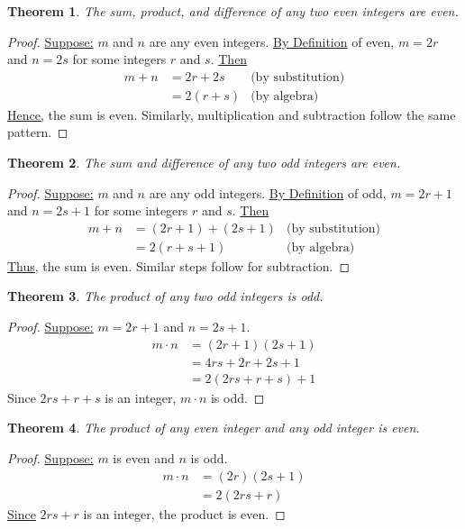 \documentclass[12pt]{article}
\newcounter{theo}[section]
\newtheorem{theorem}{Theorem}
\begin{document}
\begin{theorem}
	The sum, product, and difference of any two even integers are even.
\end{theorem}
\begin{proof}
	\underline{Suppose:} $m$ and $n$ are any even integers.\newline
	\underline{By Definition} of even, $m = 2r$ and $n = 2s$ for some integers $r$ and $s$.\newline
	\underline{Then}
	\begin{align*}
		m + n & = 2r + 2s  & \text{(by substitution)} \\
		      & = 2(r + s) & \text{(by algebra)}
	\end{align*}
	\underline{Hence,} the sum is even. Similarly, multiplication and subtraction follow the same pattern.
\end{proof}

\begin{theorem}
	The sum and difference of any two odd integers are even.
\end{theorem}
\begin{proof}
	\underline{Suppose:} $m$ and $n$ are any odd integers.\newline
	\underline{By Definition} of odd, $m = 2r + 1$ and $n = 2s + 1$ for some integers $r$ and $s$.\newline
	\underline{Then}
	\begin{align*}
		m + n & = (2r + 1) + (2s + 1) & \text{(by substitution)} \\
		      & = 2(r + s + 1)        & \text{(by algebra)}
	\end{align*}
	\underline{Thus,} the sum is even. Similar steps follow for subtraction.
\end{proof}

\begin{theorem}
	The product of any two odd integers is odd.
\end{theorem}
\begin{proof}
	\underline{Suppose:} $m = 2r + 1$ and $n = 2s + 1$.\newline
	\begin{align*}
		m \cdot n & = (2r + 1)(2s + 1)   \\
		          & = 4rs + 2r + 2s + 1  \\
		          & = 2(2rs + r + s) + 1
	\end{align*}
	Since $2rs + r + s$ is an integer, $m \cdot n$ is odd.
\end{proof}

\begin{theorem}
	The product of any even integer and any odd integer is even.
\end{theorem}
\begin{proof}
	\underline{Suppose:} $m$ is even and $n$ is odd.\newline
	\begin{align*}
		m \cdot n & = (2r)(2s + 1) \\
		          & = 2(2rs + r)
	\end{align*}
	\underline{Since} $2rs + r$ is an integer, the product is even.
\end{proof}
\end{document}
